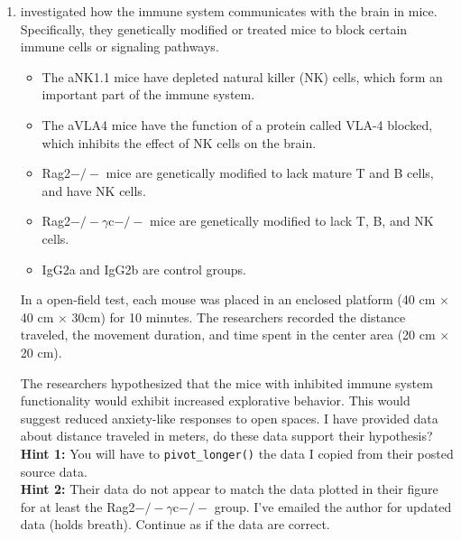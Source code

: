 \documentclass{article}\usepackage[]{graphicx}\usepackage[]{xcolor}
\begin{document}
\begin{enumerate}
\begin{enumerate}
\end{enumerate}
\item \cite{Garofalo23} investigated how the immune system communicates with 
the brain in mice. Specifically, they genetically modified or treated mice to 
block certain immune cells or signaling pathways.
\begin{itemize}
\item The aNK1.1 mice have depleted natural killer (NK) cells, which form an 
important part of the immune system.
\item The aVLA4 mice have the function of a protein called VLA-4 blocked, 
which inhibits the effect of NK cells on the brain.
\item Rag2$-/-$ mice are genetically modified to lack mature T and B cells, 
and have NK cells.
\item Rag2$-/-\gamma$c$-/-$ mice are genetically modified to lack T, B, and 
NK cells.
\item IgG2a and IgG2b are control groups.
\end{itemize}
In a open-field test, each mouse was placed in an enclosed platform (40 cm 
$\times$ 40 cm $\times$ 30cm) for 10 minutes. The researchers recorded the 
distance traveled, the movement duration, and time spent in the center area 
(20 cm $\times$ 20 cm).

The researchers hypothesized that the mice with inhibited immune system 
functionality would exhibit increased explorative behavior. This would suggest 
reduced anxiety-like responses to open spaces. I have provided data about 
distance traveled in meters, do these data support their hypothesis?\\
\textbf{Hint 1:} You will have to \texttt{pivot\_longer()} the data I copied 
from their posted source data.\\
\textbf{Hint 2:} Their data do not appear to match the data plotted in their
figure for at least the Rag2$-/-\gamma$c$-/-$ group. I've emailed the author 
for updated data (holds breath). Continue as if the data are correct.
\end{enumerate}
\end{document}
